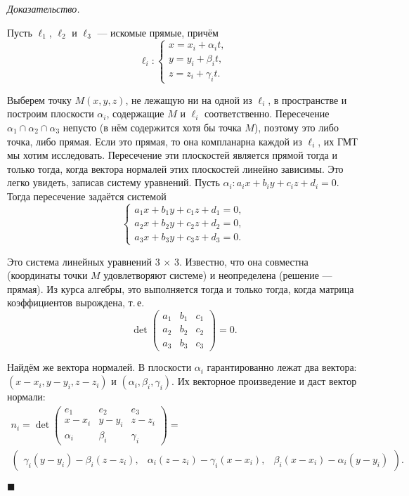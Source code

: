 \documentclass[a4paper, 12pt]{article}
\renewenvironment{proof}{
    \smallskip\noindent\textit{Доказательство.}
}{
    \hfill$\blacksquare$\par\smallskip
}
\begin{document}
\begin{proof}
    Пусть $\ell_1$, $\ell_2$ и $\ell_3$ --- искомые прямые, причём
    $$
    \ell_i:
    \begin{cases}
        x = x_i + \alpha_it,\\
        y = y_i + \beta_it,\\
        z = z_i + \gamma_it.
    \end{cases}
    $$

    Выберем точку $M(x, y, z)$, не лежащую ни на одной из $\ell_i$, в пространстве и построим плоскости $\alpha_i$, содержащие $M$ и $\ell_i$ соответственно. Пересечение $\alpha_1 \cap \alpha_2 \cap \alpha_3$ непусто (в нём содержится хотя бы точка $M$), поэтому это либо точка, либо прямая. Если это прямая, то она компланарна каждой из $\ell_i$, их ГМТ мы хотим исследовать. Пересечение эти плоскостей является прямой тогда и только тогда, когда вектора нормалей этих плоскостей линейно зависимы. Это легко увидеть, записав систему уравнений. Пусть $\alpha_i: a_ix + b_iy + c_iz + d_i = 0$. Тогда пересечение задаётся системой
    $$
    \begin{cases}
        a_1x + b_1y + c_1z + d_1 = 0,\\
        a_2x + b_2y + c_2z + d_2 = 0,\\
        a_3x + b_3y + c_3z + d_3 = 0.
    \end{cases}
    $$

    Это система линейных уравнений 3 $\times$ 3. Известно, что она совместна (координаты точки $M$ удовлетворяют системе) и неопределена (решение --- прямая). Из курса алгебры, это выполняется тогда и только тогда, когда матрица коэффициентов вырождена, т.\,е.
    $$
    \det
    \begin{pmatrix}
        a_1 & b_1 & c_1\\
        a_2 & b_2 & c_2\\
        a_3 & b_3 & c_3
    \end{pmatrix} = 0.
    $$

    Найдём же вектора нормалей. В плоскости $\alpha_i$ гарантированно лежат два вектора: $(x - x_i, y - y_i, z - z_i)$ и $(\alpha_i, \beta_i, \gamma_i)$. Их векторное произведение и даст вектор нормали:
    $$
    \begin{array}{c}\displaystyle
        n_i = \det
        \begin{pmatrix}
            e_1 & e_2 & e_3\\
            x - x_i & y - y_i & z - z_i\\
            \alpha_i & \beta_i & \gamma_i
        \end{pmatrix} = {}\\\displaystyle
        \begin{pmatrix}
            \gamma_i(y - y_i) - \beta_i(z - z_i),& \alpha_i(z - z_i) - \gamma_i(x - x_i),& \beta_i(x - x_i) - \alpha_i(y - y_i)
        \end{pmatrix}.
    \end{array}
    $$


\end{proof}
\end{document}
